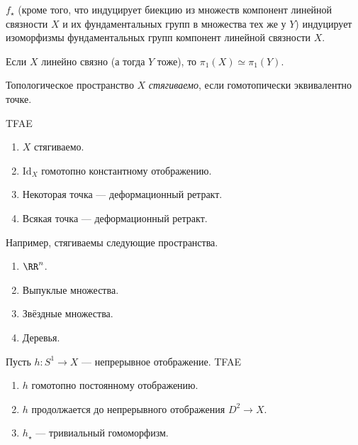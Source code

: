 \documentclass[12pt,a4paper]{article}
\newcommand{\Id}{\ensuremath{\mathrm{Id}}\xspace}
\begin{document}
    \begin{corollary}
        $f_\star$ (кроме того, что индуцирует биекцию из множеств компонент линейной связности $X$ и их фундаментальных групп в множества тех же у $Y$) индуцирует изоморфизмы фундаментальных групп компонент линейной связности $X$.
    \end{corollary}

    \begin{corollary}
        Если $X$ линейно связно (а тогда $Y$ тоже), то $\pi_1(X) \simeq \pi_1(Y)$.
    \end{corollary}

    \begin{definition}
        Топологическое пространство $X$ \emph{стягиваемо}, если гомотопически эквивалентно точке.
    \end{definition}

    \begin{lemma}
        TFAE
        \begin{enumerate}
            \item $X$ стягиваемо.
            \item $\Id_X$ гомотопно константному отображению.
            \item Некоторая точка --- деформационный ретракт.
            \item Всякая точка --- деформационный ретракт.
        \end{enumerate}
    \end{lemma}

    \begin{example}
        Например, стягиваемы следующие пространства.
        \begin{enumerate}
            \item $\RR^n$.
            \item Выпуклые множества.
            \item Звёздные множества.
            \item Деревья.
        \end{enumerate}
    \end{example}

    \begin{lemma}
        Пусть $h: S^1 \to X$ --- непрерывное отображение. TFAE
        \begin{enumerate}
            \item $h$ гомотопно постоянному отображению.
            \item $h$ продолжается до непрерывного отображения $D^2 \to X$.
            \item $h_\star$ --- тривиальный гомоморфизм.
        \end{enumerate}
    \end{lemma}
\end{document}
